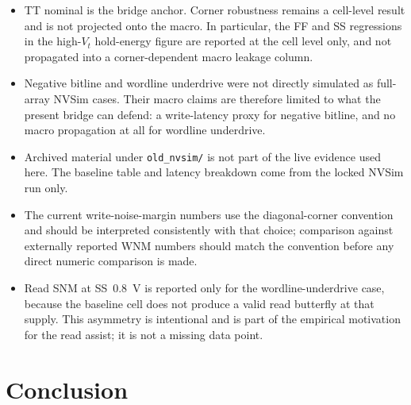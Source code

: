 \documentclass[pdflatex,sn-mathphys-num]{sn-jnl}%
\theoremstyle{thmstyleone}%
\theoremstyle{thmstyletwo}%
\theoremstyle{thmstylethree}%
\begin{document}
\begin{itemize}
\item TT nominal is the bridge anchor. Corner robustness remains a cell-level result and is not projected onto the macro. In particular, the FF and SS regressions in the high-$V_t$ hold-energy figure are reported at the cell level only, and not propagated into a corner-dependent macro leakage column.
\item Negative bitline and wordline underdrive were not directly simulated as full-array NVSim cases. Their macro claims are therefore limited to what the present bridge can defend: a write-latency proxy for negative bitline, and no macro propagation at all for wordline underdrive.
\item Archived material under \texttt{old\_nvsim/} is not part of the live evidence used here. The baseline table and latency breakdown come from the locked NVSim run only.
\item The current write-noise-margin numbers use the diagonal-corner convention and should be interpreted consistently with that choice; comparison against externally reported WNM numbers should match the convention before any direct numeric comparison is made.
\item Read SNM at SS~0.8~V is reported only for the wordline-underdrive case, because the baseline cell does not produce a valid read butterfly at that supply. This asymmetry is intentional and is part of the empirical motivation for the read assist; it is not a missing data point.
\end{itemize}

\section{Conclusion}\label{sec:conclusion}
\end{document}
